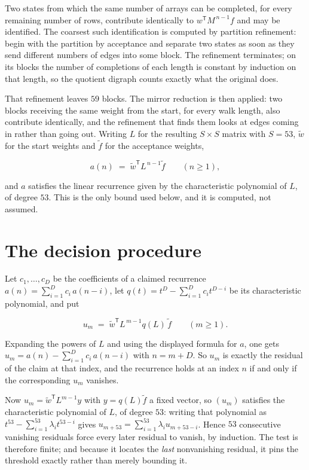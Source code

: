 \documentclass[11pt]{article}
\theoremstyle{definition}
\begin{document}
Two states from which the same number of arrays can be completed, for every remaining number of rows, contribute identically to $w^{\mathsf T}M^{\,n-1}f$ and may be identified. The coarsest such identification is computed by partition refinement: begin with the partition by acceptance and separate two states as soon as they send different numbers of edges into some block. The refinement terminates; on its blocks the number of completions of each length is constant by induction on that length, so the quotient digraph counts exactly what the original does.

That refinement leaves $59$ blocks. The mirror reduction is then applied: two blocks receiving the same weight from the start, for every walk length, also contribute identically, and the refinement that finds them looks at edges coming in rather than going out. Writing $L$ for the resulting $S \times S$ matrix with $S = 53$, $\tilde w$ for the start weights and $\tilde f$ for the acceptance weights,

\[a(n) \;=\; \tilde w^{\mathsf T} L^{\,n-1} \tilde f \qquad (n \ge 1),\]

and $a$ satisfies the linear recurrence given by the characteristic polynomial of $L$, of degree $53$. This is the only bound used below, and it is computed, not assumed.

\section{The decision procedure}

Let $c_1,\dots,c_D$ be the coefficients of a claimed recurrence $a(n) = \sum_{i=1}^{D} c_i\,a(n-i)$, let $q(t) = t^{D} - \sum_{i=1}^{D} c_i t^{D-i}$ be its characteristic polynomial, and put

\[u_m \;=\; \tilde w^{\mathsf T} L^{\,m-1} q(L)\,\tilde f \qquad (m \ge 1).\]

Expanding the powers of $L$ and using the displayed formula for $a$, one gets $u_m = a(n) - \sum_{i=1}^{D} c_i\,a(n-i)$ with $n = m + D$. So $u_m$ is exactly the residual of the claim at that index, and the recurrence holds at an index $n$ if and only if the corresponding $u_m$ vanishes.

Now $u_m = \tilde w^{\mathsf T} L^{m-1} y$ with $y = q(L)\tilde f$ a fixed vector, so $(u_m)$ satisfies the characteristic polynomial of $L$, of degree $53$: writing that polynomial as $t^{53} - \sum_{i=1}^{53} \lambda_i t^{53-i}$ gives $u_{m+53} = \sum_{i=1}^{53} \lambda_i u_{m+53-i}$. Hence $53$ consecutive vanishing residuals force every later residual to vanish, by induction. The test is therefore finite; and because it locates the {\itshape last} nonvanishing residual, it pins the threshold exactly rather than merely bounding it.
\end{document}
